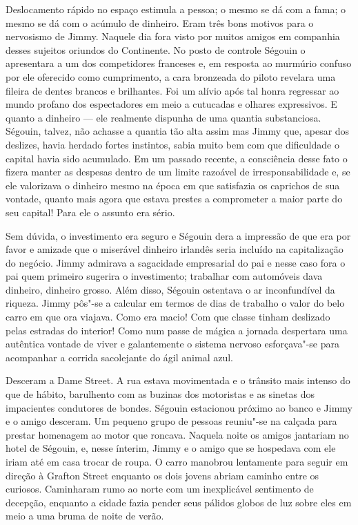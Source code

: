 Deslocamento rápido no espaço estimula a pessoa; o mesmo se dá com a fama; o
mesmo se dá com o acúmulo de dinheiro.  Eram três bons motivos para o
nervosismo de Jimmy.  Naquele dia fora visto por muitos amigos em companhia
desses sujeitos oriundos do Continente.  No posto de controle Ségouin o
apresentara a um dos competidores franceses e, em resposta ao murmúrio confuso
por ele oferecido como cumprimento, a cara bronzeada do piloto revelara uma
fileira de dentes brancos e brilhantes.  Foi um alívio após tal honra regressar
ao mundo profano dos espectadores em meio a cutucadas e olhares expressivos.  E
quanto a dinheiro --- ele realmente dispunha de uma quantia substanciosa.
Ségouin, talvez, não achasse a quantia tão alta assim mas Jimmy que, apesar dos
deslizes, havia herdado fortes instintos, sabia muito bem com que dificuldade o
capital havia sido acumulado.  Em um passado recente, a consciência desse fato
o fizera manter as despesas dentro de um limite razoável de irresponsabilidade
e, se ele valorizava o dinheiro mesmo na época em que satisfazia os caprichos
de sua vontade, quanto mais agora que estava prestes a comprometer a maior
parte do seu capital!  Para ele o assunto era sério.

Sem dúvida, o investimento era seguro e Ségouin dera a impressão de que era por
favor e amizade que o miserável dinheiro irlandês seria incluído na
capitalização do negócio.  Jimmy admirava a sagacidade empresarial do pai e
nesse caso fora o pai quem primeiro sugerira o investimento; trabalhar com
automóveis dava dinheiro, dinheiro grosso.  Além disso, Ségouin ostentava o ar
inconfundível da riqueza.  Jimmy pôs"-se a calcular em termos de dias de
trabalho o valor do belo carro em que ora viajava.  Como era macio!  Com que
classe tinham deslizado pelas estradas do interior!  Como num passe de mágica a
jornada despertara uma autêntica vontade de viver e galantemente o sistema
nervoso esforçava"-se para acompanhar a corrida sacolejante do ágil animal azul.

Desceram a Dame Street.  A rua estava movimentada e o trânsito mais intenso do
que de hábito, barulhento com as buzinas dos motoristas e as sinetas dos
impacientes condutores de bondes.  Ségouin estacionou próximo ao banco e Jimmy
e o amigo desceram.  Um pequeno grupo de pessoas reuniu"-se na calçada para
prestar homenagem ao motor que roncava.  Naquela noite os amigos jantariam no
hotel de Ségouin, e, nesse ínterim, Jimmy e o amigo que se hospedava com ele
iriam até em casa trocar de roupa.  O carro manobrou lentamente para seguir em
direção à Grafton Street enquanto os dois jovens abriam caminho entre os
curiosos.  Caminharam rumo ao norte com um inexplicável sentimento de decepção,
enquanto a cidade fazia pender seus pálidos globos de luz sobre eles em meio a
uma bruma de noite de verão.

